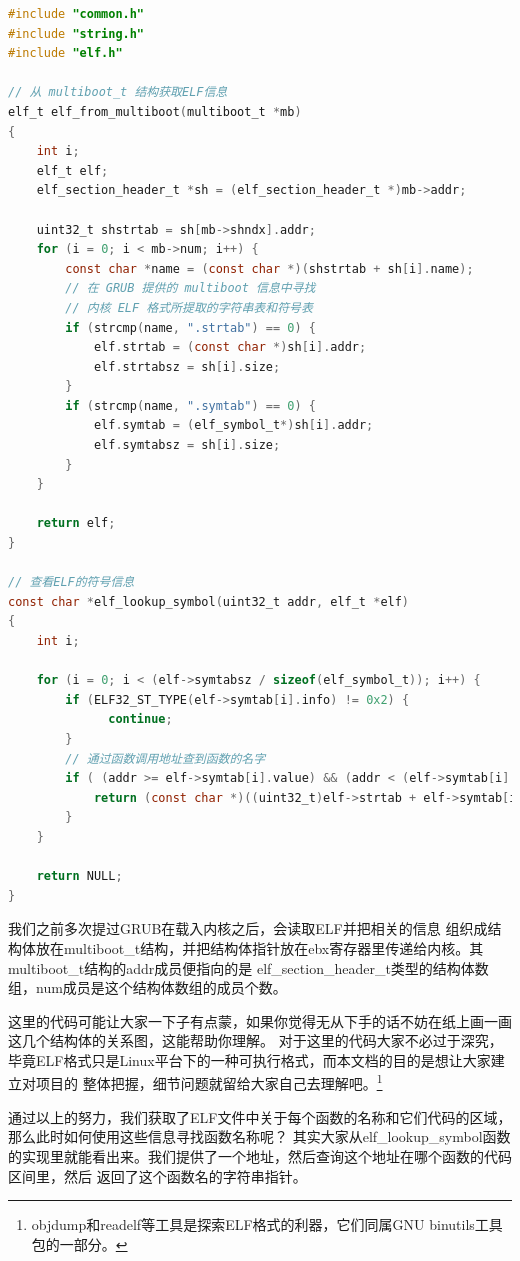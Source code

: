 \begin{lstlisting}[language = C, caption = kernel/debug/elf.c]
#include "common.h"
#include "string.h"
#include "elf.h"

// 从 multiboot_t 结构获取ELF信息
elf_t elf_from_multiboot(multiboot_t *mb)
{
	int i;
	elf_t elf;
	elf_section_header_t *sh = (elf_section_header_t *)mb->addr;

	uint32_t shstrtab = sh[mb->shndx].addr;
	for (i = 0; i < mb->num; i++) {
		const char *name = (const char *)(shstrtab + sh[i].name);
		// 在 GRUB 提供的 multiboot 信息中寻找
		// 内核 ELF 格式所提取的字符串表和符号表
		if (strcmp(name, ".strtab") == 0) {
			elf.strtab = (const char *)sh[i].addr;
			elf.strtabsz = sh[i].size;
		}
		if (strcmp(name, ".symtab") == 0) {
			elf.symtab = (elf_symbol_t*)sh[i].addr;
			elf.symtabsz = sh[i].size;
		}
	}

	return elf;
}

// 查看ELF的符号信息
const char *elf_lookup_symbol(uint32_t addr, elf_t *elf)
{
	int i;

	for (i = 0; i < (elf->symtabsz / sizeof(elf_symbol_t)); i++) {
		if (ELF32_ST_TYPE(elf->symtab[i].info) != 0x2) {
		      continue;
		}
		// 通过函数调用地址查到函数的名字
		if ( (addr >= elf->symtab[i].value) && (addr < (elf->symtab[i].value + elf->symtab[i].size)) ) {
			return (const char *)((uint32_t)elf->strtab + elf->symtab[i].name);
		}
	}

	return NULL;
}
\end{lstlisting}

\par 我们之前多次提过GRUB在载入内核之后，会读取ELF并把相关的信息\allowbreak
组织成结构体放在multiboot\_t结构，并把结构体指针放在ebx寄存器里传递给内核。其multiboot\_t结构的addr成员便指向的是\allowbreak
elf\_section\_header\_t类型的结构体数组，num成员是这个结构体数组的成员个数。

\par 这里的代码可能让大家一下子有点蒙，如果你觉得无从下手的话不妨在纸上画一画这几个结构体的关系图，这能帮助你理解。\allowbreak
对于这里的代码大家不必过于深究，毕竟ELF格式只是Linux平台下的一种可执行格式，而本文档的目的是想让大家建立对项目的\allowbreak
整体把握，细节问题就留给大家自己去理解吧。\footnote{objdump和readelf等工具是探索ELF格式的利器，它们同属GNU binutils工具包的一部分。}

\par 通过以上的努力，我们获取了ELF文件中关于每个函数的名称和它们代码的区域，那么此时如何使用这些信息寻找函数名称呢？\allowbreak
其实大家从elf\_lookup\_symbol函数的实现里就能看出来。我们提供了一个地址，然后查询这个地址在哪个函数的代码区间里，然后\allowbreak
返回了这个函数名的字符串指针。

